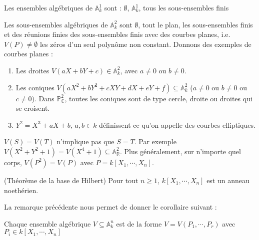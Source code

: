             \begin{exo}
                Les ensembles algébriques de $\mathbb{A}^1_k$ sont : $\emptyset$, $\mathbb{A}_k^1$, tous les sous-ensembles finis 
            \end{exo}
            \begin{expl}
                Les sous-ensembles algébriques de $\mathbb{A}^2_k$ sont $\emptyset$, tout le plan, les sous-ensembles finis et des réunions finies des sous-ensembles finis avec des courbes planes, i.e. $V(P) \neq \emptyset$ les zéros d'un seul polynôme non constant. Donnons des exemples de courbes planes :
                \begin{enumerate}
                    \item Les droites $V(aX + bY + c) \in \mathbb{A}_k^2$, avec $a \neq 0$ ou $b \neq 0$.
                    \item Les coniques $V(aX^2 + bY^2 + cXY + dX + eY + f) \subseteq \mathbb{A}_k^2$ ($a \neq 0$ ou $b \neq 0$ ou $c \neq 0$). Dans $\mathbb{P}_\mathbb{C}^2$, toutes les coniques sont de type cercle, droite ou droites qui se croisent.
                    \item $Y^2 = X^3 + aX + b$, $a,b \in k$ définissent ce qu'on appelle des courbes elliptiques.
                \end{enumerate}
            \end{expl}
            \begin{remq}
                $V(S) = V(T)$ n'implique pas que $S = T$. Par exemple $V(X^2 + Y^2 + 1) = V(X^4 + 1) \subseteq \mathbb{A}_\mathbb{R}^2$. Plus généralement, sur n'importe quel corps, $V(P^2) = V(P)$ avec $P = k[X_1, \cdots, X_n]$.
            \end{remq}
            \begin{theo} (Théorème de la base de Hilbert)
                Pour tout $n \geq 1$, $k[X_1, \cdots, X_n]$ est un anneau noethérien.
            \end{theo}
            La remarque précédente nous permet de donner le corollaire suivant :
            \begin{coro}
                Chaque ensemble algébrique $V \subseteq \mathbb{A}_k^n$ est de la forme $V = V(P_1, \cdots, P_r)$ avec $P_i \in k[X_1, \cdots, X_n]$
            \end{coro}

